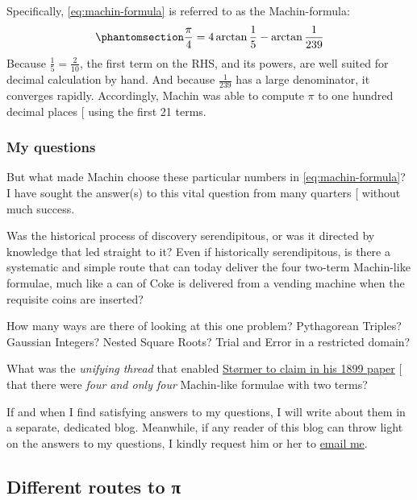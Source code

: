 \documentclass[
  a4paper,
]{article}
\begin{document}
Specifically, \cref{eq:machin-formula} is referred to as the
Machin-formula:
\begin{equation}\phantomsection\label{eq:machin-formula}{
\frac{\pi}{4} = 4\arctan\frac{1}{5} - \arctan\frac {1}{239}
}\end{equation} Because \(\frac{1}{5} = \frac{2}{10}\), the first term
on the RHS, and its powers, are well suited for decimal calculation by
hand. And because \(\frac {1}{239}\) has a large denominator, it
converges rapidly. Accordingly, Machin was able to compute \(\pi\) to
one hundred decimal places {[}\citeproc{ref-beckmann-1971}{24}{]} using
the first 21 terms.

\subsubsection{My questions}\label{my-questions}

But what made Machin choose these particular numbers in
\cref{eq:machin-formula}? I have sought the answer(s) to this vital
question from many quarters {[}\citeproc{ref-mse-question-2024}{25}{]}
without much success.

Was the historical process of discovery serendipitous, or was it
directed by knowledge that led straight to it? Even if historically
serendipitous, is there a systematic and simple route that can today
deliver the four two-term Machin-like formulae, much like a can of Coke
is delivered from a vending machine when the requisite coins are
inserted?

How many ways are there of looking at this one problem? Pythagorean
Triples? Gaussian Integers? Nested Square Roots? Trial and Error in a
restricted domain?

What was the \emph{unifying thread} that enabled
\href{http://www.numdam.org/articles/10.24033/bsmf.603/}{Størmer to
claim in his 1899 paper} {[}\citeproc{ref-stormer-1899}{26}{]} that
there were \emph{four and only four} Machin-like formulae with two
terms?

If and when I find satisfying answers to my questions, I will write
about them in a separate, dedicated blog. Meanwhile, if any reader of
this blog can throw light on the answers to my questions, I kindly
request him or her to \href{mailto:feedback.swanlotus@gmail.com}{email
me}.

\subsection{Different routes to π}\label{different-routes-to-ux3c0}
\end{document}
